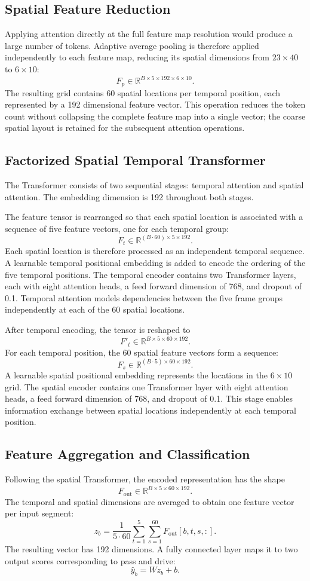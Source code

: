 \documentclass[conference]{IEEEtran}
\begin{document}
\subsection{Spatial Feature Reduction}
Applying attention directly at the full feature map resolution would produce a large number of tokens. Adaptive average pooling is therefore applied independently to each feature map, reducing its spatial dimensions from $23\times40$ to $6\times10$:
\[
F_p\in\mathbb{R}^{B\times5\times192\times6\times10}.
\]
The resulting grid contains 60 spatial locations per temporal position, each represented by a 192 dimensional feature vector. This operation reduces the token count without collapsing the complete feature map into a single vector; the coarse spatial layout is retained for the subsequent attention operations.

\subsection{Factorized Spatial Temporal Transformer}
The Transformer consists of two sequential stages: temporal attention and spatial attention. The embedding dimension is 192 throughout both stages.

 The feature tensor is rearranged so that each spatial location is associated with a sequence of five feature vectors, one for each temporal group:
\[
F_t\in\mathbb{R}^{(B\cdot60)\times5\times192}.
\]
Each spatial location is therefore processed as an independent temporal sequence. A learnable temporal positional embedding is added to encode the ordering of the five temporal positions. The temporal encoder contains two Transformer layers, each with eight attention heads, a feed forward dimension of 768, and dropout of 0.1. Temporal attention models dependencies between the five frame groups independently at each of the 60 spatial locations.

After temporal encoding, the tensor is reshaped to
\[
F'_t\in\mathbb{R}^{B\times5\times60\times192}.
\]
For each temporal position, the 60 spatial feature vectors form a sequence:
\[
F_s\in\mathbb{R}^{(B\cdot5)\times60\times192}.
\]
A learnable spatial positional embedding represents the locations in the $6\times10$ grid. The spatial encoder contains one Transformer layer with eight attention heads, a feed forward dimension of 768, and dropout of 0.1. This stage enables information exchange between spatial locations independently at each temporal position.

\subsection{Feature Aggregation and Classification}
Following the spatial Transformer, the encoded representation has the shape
\[
F_{\mathrm{out}}\in\mathbb{R}^{B\times5\times60\times192}.
\]
The temporal and spatial dimensions are averaged to obtain one feature vector per input segment:
\[
z_b=\frac{1}{5\cdot60}\sum_{t=1}^{5}\sum_{s=1}^{60}F_{\mathrm{out}}[b,t,s,:].
\]
The resulting vector has 192 dimensions. A fully connected layer maps it to two output scores corresponding to pass and drive:
\[
\hat y_b=Wz_b+b.
\]
\end{document}
